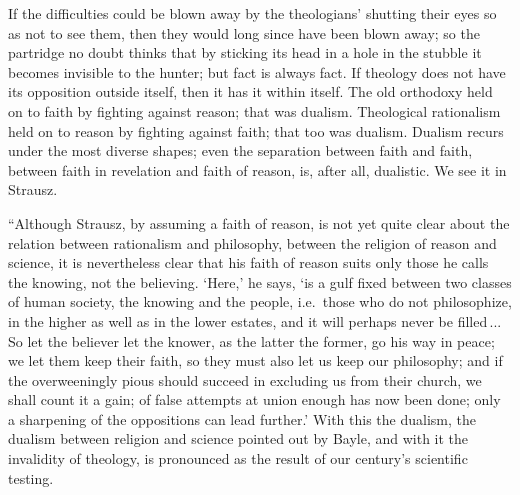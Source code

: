 \documentclass[12pt]{book}
\newcommand{\opage}[1]{\marginnote{\footnotesize\textit{[#1]}}}
\begin{document}
If the difficulties could be blown away by the theologians' shutting their
eyes so as not to see them, then they would long since have been blown away;
so the partridge no doubt thinks that by sticking its head in a hole in the
stubble it becomes invisible to the hunter; but fact is always fact. If
theology does not have its opposition outside itself, then it has it within
itself. The old orthodoxy held on to faith by fighting against reason; that
was dualism. Theological rationalism held on to reason by fighting against
faith; that too was dualism. Dualism recurs under the most diverse shapes;
even the separation between faith and faith, between
\opage{271}\setcounter{footnote}{0}%
faith in revelation and faith of reason, is, after all, dualistic. We see it
in Strausz.

``Although Strausz, by assuming a faith of reason, is not yet quite clear
about the relation between rationalism and philosophy, between the religion of
reason and science, it is nevertheless clear that his faith of reason suits
only those he calls the knowing, not the believing. `Here,' he says, `is a
gulf fixed between two classes of human society, the knowing and the people,
i.e.\ those who do not philosophize, in the higher as well as in the lower
estates, and it will perhaps never be filled\,... So let the believer let the
knower, as the latter the former, go his way in peace; we let them keep their
faith, so they must also let us keep our philosophy; and if the overweeningly
pious should succeed in excluding us from their church, we shall count it a
gain; of false attempts at union enough has now been done; only a sharpening of
the oppositions can lead further.' With this the dualism, the dualism between
religion and science pointed out by Bayle, and with it the invalidity of
theology, is pronounced as the result of our century's scientific testing.
\end{document}
